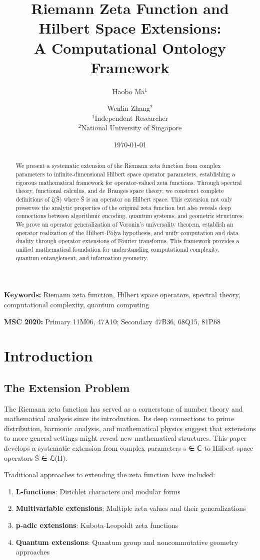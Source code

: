 \documentclass[12pt]{article}
\title{Riemann Zeta Function and Hilbert Space Extensions: \\ A Computational Ontology Framework}
\author{Haobo Ma$^1$ \and Wenlin Zhang$^2$\\
\small $^1$Independent Researcher\\
\small $^2$National University of Singapore}
\date{\today}
\theoremstyle{plain}
\theoremstyle{definition}
\begin{document}
\maketitle

\begin{abstract}
We present a systematic extension of the Riemann zeta function from complex parameters to infinite-dimensional Hilbert space operator parameters, establishing a rigorous mathematical framework for operator-valued zeta functions. Through spectral theory, functional calculus, and de Branges space theory, we construct complete definitions of ζ(Ŝ) where Ŝ is an operator on Hilbert space. This extension not only preserves the analytic properties of the original zeta function but also reveals deep connections between algorithmic encoding, quantum systems, and geometric structures. We prove an operator generalization of Voronin's universality theorem, establish an operator realization of the Hilbert-Pólya hypothesis, and unify computation and data duality through operator extensions of Fourier transforms. This framework provides a unified mathematical foundation for understanding computational complexity, quantum entanglement, and information geometry.
\end{abstract}

\noindent\textbf{Keywords:} Riemann zeta function, Hilbert space operators, spectral theory, computational complexity, quantum computing

\noindent\textbf{MSC 2020:} Primary 11M06, 47A10; Secondary 47B36, 68Q15, 81P68

\section{Introduction}

\subsection{The Extension Problem}

The Riemann zeta function has served as a cornerstone of number theory and mathematical analysis since its introduction. Its deep connections to prime distribution, harmonic analysis, and mathematical physics suggest that extensions to more general settings might reveal new mathematical structures. This paper develops a systematic extension from complex parameters s ∈ ℂ to Hilbert space operators Ŝ ∈ ℒ(H).

Traditional approaches to extending the zeta function have included:
\begin{enumerate}
\item \textbf{L-functions}: Dirichlet characters and modular forms
\item \textbf{Multivariable extensions}: Multiple zeta values and their generalizations
\item \textbf{p-adic extensions}: Kubota-Leopoldt zeta functions
\item \textbf{Quantum extensions}: Quantum group and noncommutative geometry approaches
\end{enumerate}
\end{document}

